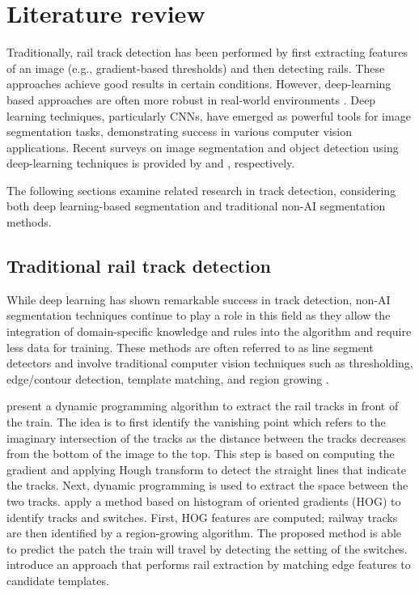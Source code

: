 \documentclass[Master,MDS,english]{BASE/twbook} %
\begin{document}
\chapter{Literature review} %

Traditionally, rail track detection has been performed by first extracting features of an image (e.g., gradient-based thresholds) and then detecting rails. These approaches achieve good results in certain conditions. However, deep-learning based approaches are often more robust in real-world environments \citep{7350873, 8859360, 10.1145/3503161.3548050}.
Deep learning techniques, particularly CNNs, have emerged as powerful tools for image segmentation tasks, demonstrating success in various computer vision applications. Recent surveys on image segmentation and object detection using deep-learning techniques is provided by \cite{cmc.2023.032757} and \cite{ZAIDI2022103514}, respectively.

The following sections examine related research in track detection, considering both deep learning-based segmentation and traditional non-AI segmentation methods.



\section{Traditional rail track detection}

While deep learning has shown remarkable success in track detection, non-AI segmentation techniques continue to play a role in this field as they allow the integration of domain-specific knowledge and rules into the algorithm and require less data for training. These methods are often referred to as line segment detectors and involve traditional computer vision techniques such as thresholding, edge/contour detection, template matching, and region growing \citep{4731268, ipol.2012.gjmr-lsd, 8100103, SAHOO1988233}.

\cite{5309526} present a dynamic programming algorithm to extract the rail tracks in front of the train. The idea is to first identify the vanishing point which refers to the imaginary intersection of the tracks as the distance between the tracks decreases from the bottom of the image to the top.  This step is based on computing the gradient and applying Hough transform to detect the straight lines that indicate the tracks. Next, dynamic programming is used to extract the space between the two tracks.
 \cite{qi2013efficient} apply a method based on histogram of oriented gradients (HOG) to identify tracks and switches. First, HOG features are computed;  railway tracks are then identified by a region-growing algorithm. The proposed method is able to predict the patch the train will travel by detecting the setting of the switches. 
\cite{5940410} introduce an approach that performs rail extraction by matching edge features to candidate templates.
\end{document}
